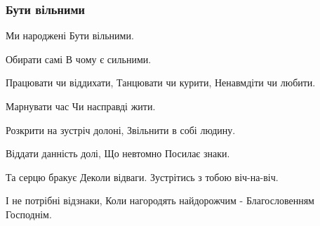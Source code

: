  
 
 

\subsubsection{Бути вільними}

Ми народжені
Бути вільними.

Обирати самі
В чому є сильними.

Працювати чи віддихати,
Танцювати чи курити,
Ненавмдіти чи любити.

Марнувати час
Чи насправді жити.

Розкрити на зустріч долоні,
Звільнити в собі людину.

Віддати данність долі,
Що невтомно
Посилає знаки.

Та серцю бракує
Деколи відваги.
Зустрітись з тобою віч-на-віч.

І не потрібні відзнаки,
Коли нагородять найдорожчим -
Благословенням Господнім.
